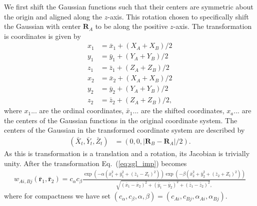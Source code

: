 \documentclass{revtex4}
\begin{document}
  We first shift the Gaussian functions such that their centers are symmetric about the origin and aligned along the $z$-axis.
  This rotation chosen to specifically shift the Gaussian with center $\mathbf{R}_A$ to be along the positive $z$-axis.
  The transformation is coordinates is given by
  \begin{align}
    x_1 &= \bar{x}_1 + (X_A + X_B)/2 \\
    y_1 &= \bar{y}_1 + (Y_A + Y_B)/2 \\
    z_1 &= \bar{z}_1 + (Z_A + Z_B)/2 \\
    x_2 &= \bar{x}_2 + (X_A + X_B)/2 \\
    y_2 &= \bar{y}_2 + (Y_A + Y_B)/2 \\
    z_2 &= \bar{z}_2 + (Z_A + Z_B)/2,
  \end{align}
  where $x_1...$ are the ordinal coordinates, $\bar{x}_1...$ are the shifted coordinates, $x_a...$ are the centers of the Gaussian functions in the original coordinate system.
  The centers of the Gaussian in the transformed coordinate system are described by
  \begin{align}
    (\bar{X}_t, \bar{Y}_t, \bar{Z}_t) &= (0, 0, |\mathbf{R}_B - \mathbf{R}_A| / 2).
  \end{align}
  As this is transformation is a translation and a rotation, its Jacobian is trivially unity.
  After the transformation Eq.\ (\ref{eq:sgl_imp}) becomes
  \begin{align}
    w_{Ai,Bj}(\bar{\mathbf{r}}_1, \bar{\mathbf{r}}_2) = 
    c_{\alpha} c_{\beta}
    \frac{
      \exp(-\alpha(\bar{x}_1^2 + \bar{y}_1^2 + (\bar{z}_1 - Z_t)^2))
      \exp(-\beta(\bar{x}_2^2 + \bar{y}_2^2 + (\bar{z}_2 + Z_t)^2))
    }
    {
      \sqrt{(\bar{x}_1 - \bar{x}_2)^2 + (\bar{y}_1 - \bar{y}_2)^2 + (\bar{z}_1 - \bar{z}_2)^2},
    }
  \end{align}
  where for compactness we have set $(c_\alpha, c_\beta, \alpha, \beta) = (c_{Ai}, c_{Bj}, \alpha_{Ai}, \alpha_{Bj})$.

\end{document}
